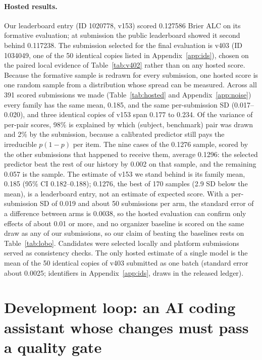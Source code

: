 \documentclass{article}
\begin{document}
\paragraph{Hosted results.}
\label{sec:hosted}
Our leaderboard entry (ID 1020778, v153) scored 0.127586 Brier ALC on its formative evaluation; at submission the public leaderboard showed it second behind 0.117238. The submission selected for the final evaluation is v403 (ID 1034049, one of the 50 identical copies listed in Appendix~\ref{app:ids}), chosen on the paired local evidence of Table~\ref{tab:v402} rather than on any hosted score. Because the formative sample is redrawn for every submission, one hosted score is one random sample from a distribution whose spread can be measured. Across all 391 scored submissions we made (Table~\ref{tab:hosted} and Appendix~\ref{app:noise}) every family has the same mean, 0.185, and the same per-submission SD (0.017--0.020), and three identical copies of v153 span 0.177 to 0.234. Of the variance of per-pair scores, 98\% is explained by which (subject, benchmark) pair was drawn and 2\% by the submission, because a calibrated predictor still pays the irreducible $p(1-p)$ per item. The nine cases of the 0.1276 sample, scored by the other submissions that happened to receive them, average 0.1296: the selected predictor beat the rest of our history by 0.002 on that sample, and the remaining 0.057 is the sample. The estimate of v153 we stand behind is its family mean, 0.185 (95\% CI 0.182--0.188); 0.1276, the best of 170 samples (2.9 SD below the mean), is a leaderboard entry, not an estimate of expected score. With a per-submission SD of 0.019 and about 50 submissions per arm, the standard error of a difference between arms is 0.0038, so the hosted evaluation can confirm only effects of about 0.01 or more, and no organizer baseline is scored on the same draw as any of our submissions, so our claim of beating the baselines rests on Table~\ref{tab:lobo}. Candidates were selected locally and platform submissions served as consistency checks. The only hosted estimate of a single model is the mean of the 50 identical copies of v403 submitted as one batch (standard error about 0.0025; identifiers in Appendix~\ref{app:ids}, draws in the released ledger).



\section{Development loop: an AI coding assistant whose changes must pass a quality gate}
\label{sec:agent}
\end{document}
